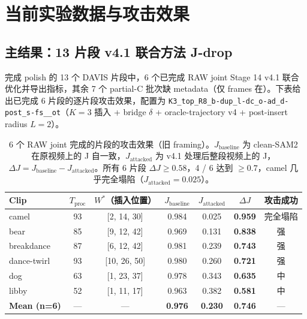 \documentclass[11pt,a4paper]{ctexart}
\begin{document}
\section{当前实验数据与攻击效果}
\label{sec:results}

\noindent{}\medskip

\subsection{主结果：13 片段 v4.1 联合方法 J-drop}

完成 polish 的 13 个 DAVIS 片段中，6 个已完成 RAW joint Stage 14 v4.1 联合优化并导出指标，其余 7 个 partial-C 批次缺 metadata（仅 frames 在）。下表给出已完成 6 片段的逐片段攻击效果，配置为 \texttt{K3\_top\_R8\_b-dup\_l-dc\_o-ad\_d-post\_s-fs\_\_ot}（$K{=}3$ 插入 + bridge $\delta$ + oracle-trajectory v4 + post-insert radius $L{=}2$）。

\begin{table}[h]
\centering
\small
\begin{tabular}{lcccccc}
\toprule
\textbf{Clip} & $T_{\mathrm{proc}}$ & \textbf{$W^*$（插入位置）} & $J_{\mathrm{baseline}}$ & $J_{\mathrm{attacked}}$ & $\Delta J$ & \textbf{攻击成功} \\
\midrule
camel        & 93 & [2, 14, 30]  & 0.984 & 0.025 & \textbf{0.959} & 完全塌陷 \\
bear         & 85 & [9, 12, 42]  & 0.969 & 0.131 & \textbf{0.838} & 强 \\
breakdance   & 87 & [6, 12, 42]  & 0.981 & 0.239 & \textbf{0.743} & 强 \\
dance-twirl  & 93 & [10, 26, 50] & 0.980 & 0.260 & \textbf{0.721} & 强 \\
dog          & 63 & [1, 23, 37]  & 0.978 & 0.343 & \textbf{0.635} & 中 \\
libby        & 52 & [1, 11, 17]  & 0.963 & 0.382 & \textbf{0.581} & 中 \\
\midrule
\textbf{Mean (n=6)} & --- & --- & \textbf{0.976} & \textbf{0.230} & \textbf{0.746} & --- \\
\bottomrule
\end{tabular}
\caption{6 个 RAW joint 完成的片段的攻击效果（旧 framing）。$J_{\mathrm{baseline}}$ 为 clean-SAM2 在原视频上的 J 自一致，$J_{\mathrm{attacked}}$ 为 v4.1 处理后整段视频上的 J，$\Delta J = J_{\mathrm{baseline}} - J_{\mathrm{attacked}}$。所有 6 片段 $\Delta J \geq 0.58$，4 / 6 达到 $\geq 0.7$，camel 几乎完全塌陷（$J_{\mathrm{attacked}}{=}0.025$）。}
\label{tab:main_results}
\end{table}
\end{document}
